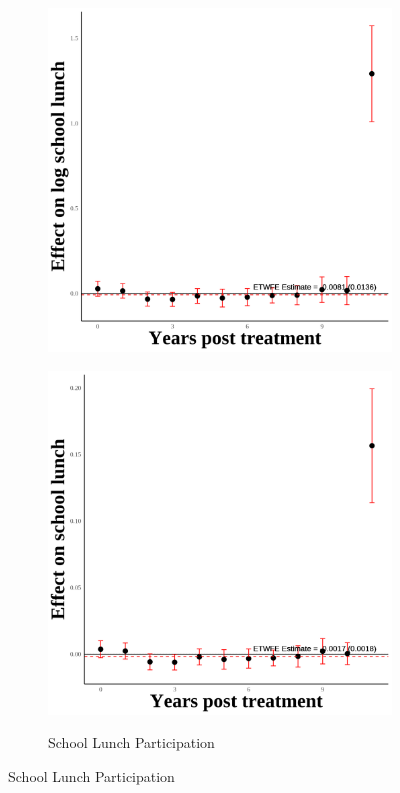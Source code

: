 \documentclass[12pt,english]{article}
\begin{document}
\begin{figure}[H]
\begin{subfigure}[b]{0.3\textwidth}
    \includegraphics[width=\linewidth]{figures/plot27-ln_schl_lunch_event_study-secgen-hh.png}
    \label{fig:ln-schl-lunch-secgen-hh}
  \end{subfigure}
  \hfill
  \begin{subfigure}[b]{0.3\textwidth}
    \centering
    \caption{School Lunch Participation}
    \includegraphics[width=\linewidth]{figures/plot28-schl_lunch_event_study-secgen-hh.png}
    \label{fig:schl-lunch-secgen-hh}
  \end{subfigure}


\end{figure}
\end{document}
